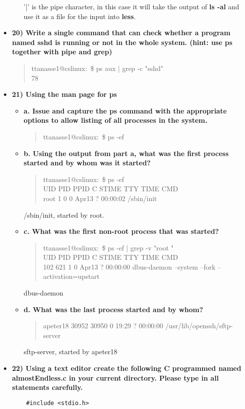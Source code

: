 \documentclass{article}
\begin{document}
\begin{itemize}
\begin{itemize}
    '|' is the pipe character, in this case it will take the output of \textbf{ls -al} and use it as a file for the input into \textbf{less}.
  \end{itemize}
  \item \textbf{20) Write a single command that can check whether a program named sshd is running or not in the whole system. (hint: use ps together with pipe and grep)}
  \begin{quote}
    ttanasse1@cslinux:~\$ ps aux | grep -c "sshd"\\
78
  \end{quote}
  \item \textbf{21) Using the man page for ps}
  \begin{itemize}
    \item \textbf{a. Issue and capture the ps command with the appropriate options to allow listing of all processes in the system.}
    \begin{quote}
      ttanasse1@cslinux:~\$ ps -ef 
    \end{quote}
    \item \textbf{b. Using the output from part a, what was the first process started and by whom was it started?}
    \begin{quote}
      ttanasse1@cslinux:~\$ ps -ef\\
UID        PID  PPID  C STIME TTY          TIME CMD\\
root         1     0  0 Apr13 ?        00:00:02 /sbin/init
    \end{quote}
    /sbin/init, started by root.
    \item \textbf{c. What was the first non-root process that was started?}
    \begin{quote}
      ttanasse1@cslinux:~\$ ps -ef | grep -v "root "\\
UID        PID  PPID  C STIME TTY          TIME CMD\\
102        621     1  0 Apr13 ?        00:00:00 dbus-daemon --system --fork --activation=upstart
    \end{quote}
    dbus-daemon
    \item \textbf{d. What was the last process started and by whom?}
    \begin{quote}
      apeter18 30952 30950  0 19:29 ?        00:00:00 /usr/lib/openssh/sftp-server
    \end{quote}
    sftp-server, started by apeter18
  \end{itemize}
  \item \textbf{22) Using a text editor create the following C programmed named almostEndless.c in your current directory. Please type in all statements carefully.}
  \begin{lstlisting}
    #include <stdio.h>


\end{lstlisting}
\end{itemize}
\end{document}

